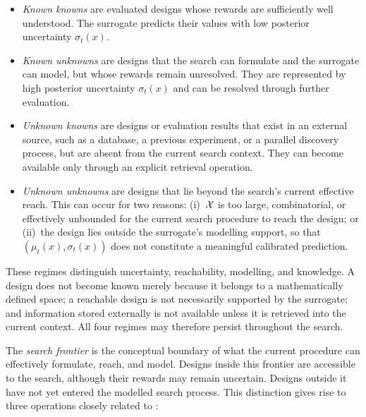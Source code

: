 \begin{itemize}[leftmargin=1.6em,itemsep=2pt,topsep=2pt]
    \item \emph{Known knowns} are evaluated designs whose rewards are
    sufficiently well understood. The surrogate predicts their values with
    low posterior uncertainty $\sigma_t(x)$.

    \item \emph{Known unknowns} are designs that the search can formulate and
    the surrogate can model, but whose rewards remain unresolved. They are
    represented by high posterior uncertainty $\sigma_t(x)$ and can be
    resolved through further evaluation.

\item \emph{Unknown knowns} are designs or evaluation results that exist in
    an external source, such as a database, a previous experiment, or a
    parallel discovery process, but are absent from the current search
    context. They can become available only through an explicit retrieval
    operation.
    
    \item \emph{Unknown unknowns} are designs that lie beyond the search's
    current effective reach. This can occur for two reasons:
    (i)~$\mathcal{X}$ is too large, combinatorial, or effectively unbounded for the current
    search procedure to reach the design; or (ii)~the design lies outside the
    surrogate's modelling support, so that $(\mu_t(x),\sigma_t(x))$ does not
    constitute a meaningful calibrated prediction.
\end{itemize}

These regimes distinguish uncertainty, reachability, modelling, and
knowledge. A design does not become known merely because it belongs to a
mathematically defined space; a reachable design is not necessarily supported
by the surrogate; and information stored externally is not available unless
it is retrieved into the current context. All four regimes may therefore
persist throughout the search.

The \emph{search frontier} is the conceptual boundary of what the current
procedure can effectively formulate, reach, and model. Designs inside this
frontier are accessible to the search, although their rewards may remain
uncertain. Designs outside it have not yet entered the modelled search
process. This distinction gives rise to three operations closely related to \cite{wang2008infinitely}:

